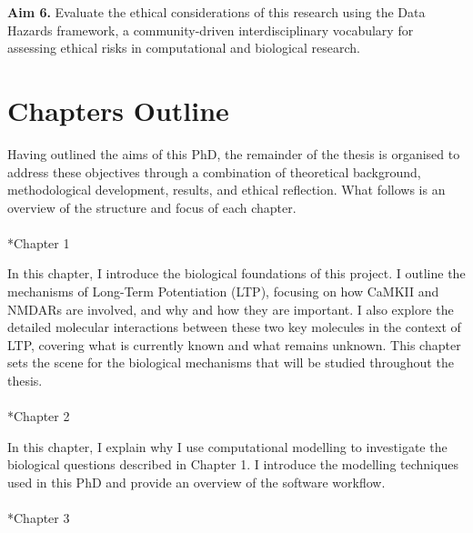 \documentclass[
  11pt,
  letterpaper,
]{scrreprt}
\makeatletter
\let\oldparagraph\paragraph
\renewcommand{\paragraph}{
    \@ifstar
      \xxxParagraphStar
      \xxxParagraphNoStar
  }
\newcommand{\xxxParagraphStar}[1]{\oldparagraph*{#1}\mbox{}}
\newcommand{\xxxParagraphNoStar}[1]{\oldparagraph{#1}\mbox{}}
\makeatother
\begin{document}
\textbf{Aim 6.} Evaluate the ethical considerations of this research
using the Data Hazards framework, a community-driven interdisciplinary
vocabulary for assessing ethical risks in computational and biological
research.

\section*{Chapters Outline}\label{chapters-outline}


Having outlined the aims of this PhD, the remainder of the thesis is
organised to address these objectives through a combination of
theoretical background, methodological development, results, and ethical
reflection. What follows is an overview of the structure and focus of
each chapter.

\paragraph*{Chapter 1}\label{chapter-1}

In this chapter, I introduce the biological foundations of this project.
I outline the mechanisms of Long-Term Potentiation (LTP), focusing on
how CaMKII and NMDARs are involved, and why and how they are important.
I also explore the detailed molecular interactions between these two key
molecules in the context of LTP, covering what is currently known and
what remains unknown. This chapter sets the scene for the biological
mechanisms that will be studied throughout the thesis.

\paragraph*{Chapter 2}\label{chapter-2}

In this chapter, I explain why I use computational modelling to
investigate the biological questions described in Chapter 1. I introduce
the modelling techniques used in this PhD and provide an overview of the
software workflow.

\paragraph*{Chapter 3}\label{chapter-3}
\end{document}
